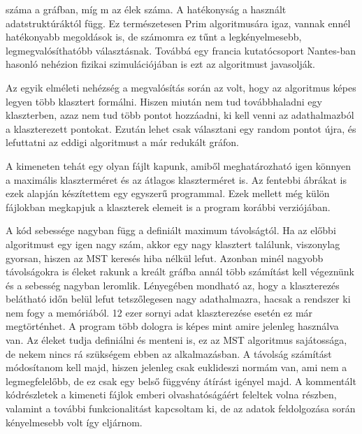 \documentclass[a4paper,12pt]{article}
\begin{document}
száma a gráfban, míg m az élek száma. A hatékonyság a használt adatstruktúráktól függ. Ez természetesen Prim algoritmusára igaz, vannak ennél hatékonyabb megoldások is, de számomra ez tűnt a legkényelmesebb, legmegvalósíthatóbb választásnak. Továbbá egy francia kutatócsoport Nantes-ban hasonló nehézion fizikai szimulációjában is ezt az algoritmust javasolják.
\par  Az egyik elméleti nehézség a megvalósítás során az volt, hogy az algoritmus képes legyen több klasztert formálni. Hiszen miután nem tud továbbhaladni egy klaszterben, azaz nem tud több pontot hozzáadni, ki kell venni az adathalmazból a klaszterezett pontokat. Ezután lehet csak választani egy random pontot újra, és lefuttatni az eddigi algoritmust a már redukált gráfon.
\par A kimeneten tehát egy olyan fájlt kapunk, amiből meghatározható igen könnyen a maximális klaszterméret és az átlagos klaszterméret is.
Az fentebbi ábrákat is ezek alapján készítettem egy egyszerű programmal. Ezek mellett még külön fájlokban megkapjuk a klaszterek elemeit is
a program korábbi verziójában.
\par A kód sebessége nagyban függ a definiált maximum távolságtól. Ha az előbbi algoritmust egy igen nagy szám,
akkor egy nagy klasztert találunk, viszonylag gyorsan, hiszen az MST keresés hiba nélkül lefut. Azonban minél nagyobb távolságokra is
éleket rakunk a kreált gráfba annál több számítást kell végeznünk és a sebesség nagyban leromlik. Lényegében mondható az, hogy a
klaszterezés belátható időn belül lefut tetszőlegesen nagy adathalmazra, hacsak a rendszer ki nem fogy a memóriából. 12 ezer sornyi adat 
klaszterezése esetén ez már megtörténhet. A program több dologra is képes mint amire jelenleg használva van. Az éleket tudja definiálni és
menteni is, ez az MST algoritmus sajátossága, de nekem nincs rá szükségem ebben az alkalmazásban. A távolság számítást módosítanom kell majd,
hiszen jelenleg csak euklideszi normám van, ami nem a legmegfelelőbb, de ez csak egy belső függvény átírást igényel majd. A kommentált kódrészletek 
a kimeneti fájlok emberi olvashatóságáért feleltek volna részben, valamint a további funkcionalitást kapcsoltam ki, de az adatok feldolgozása során
 kényelmesebb volt így eljárnom.
\end{document}
